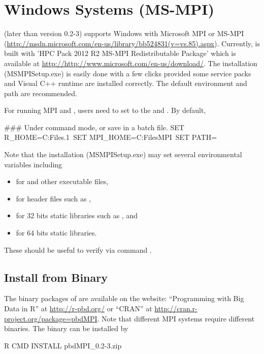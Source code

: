 

\section[Windows Systems (MS-MPI)]{Windows Systems (MS-MPI)}
\label{sec:windows_systems_msmpi}

 (later than version 0.2-3) supports Windows with
Microsoft MPI or MS-MPI
(\url{http://msdn.microsoft.com/en-us/library/bb524831(v=vs.85).aspx}).
Currently,  is built with
'HPC Pack 2012 R2 MS-MPI Redistributable Package' which is available
at \url{http://http://www.microsoft.com/en-us/download/}.
The installation (MSMPISetup.exe) is easily done with a few clicks
provided some service packs and Visual C++ runtime are installed correctly.
The default environment and path are recommended.

For running MPI and , users need to set  to the
 and . By default,
\begin{Command}
### Under command mode, or save in a batch file.
SET R_HOME=C:\Program Files\R{}.1\
SET MPI_HOME=C:\Program Files\Microsoft MPI\
SET PATH=%
\end{Command}

Note that the installation (MSMPISetup.exe) may set
several environmental variables including
\begin{itemize}
\item {} for  and other executable files,
\item {} for header files such as ,
\item \code{MSMPI_LIB32} for 32 bits static libraries such as ,
      and
\item \code{MSMPI_LIB64} for 64 bits static libraries.
\end{itemize}
These should be useful to verify via \proglang{R} command .


\subsection[Install from Binary]{Install from Binary}
\label{sec:install_from_binary}

The binary packages of \pkg{pbdMPI} are available on the website:
``Programming with Big Data in R'' at
\url{http://r-pbd.org/} or
``CRAN'' at
\url{http://cran.r-project.org/package=pbdMPI}.
Note that different MPI systems require different binaries.
The binary can be installed by
\begin{Command}
R CMD INSTALL pbdMPI_0.2-3.zip
\end{Command}

